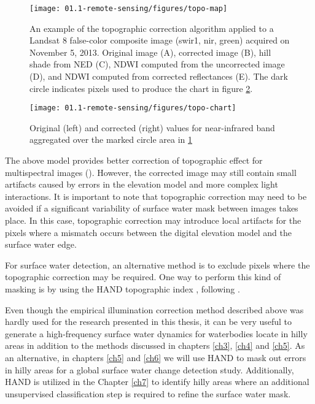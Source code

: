 \begin{figure}[H]
	\texttt{[image: 01.1-remote-sensing/figures/topo-map]}
	\caption{An example of the topographic correction algorithm \cite{tan2013improved} applied to a Landsat 8 false-color composite image (swir1, nir, green) acquired on November 5, 2013. Original image (A), corrected image (B), hill shade from \gls{NED} (C), \gls{NDWI} computed from the uncorrected image (D), and \gls{NDWI} computed from corrected reflectances (E). The dark circle indicates pixels used to produce the chart in figure \ref{fig:ch1-topo-chart}.  }
	\label{fig:ch1-topo-map}
\end{figure}

\begin{figure}[H]
	\texttt{[image: 01.1-remote-sensing/figures/topo-chart]}
	\caption{Original (left) and corrected (right) values for near-infrared band aggregated over the marked circle area in \protect \ref{fig:ch1-topo-map}}
	\label{fig:ch1-topo-chart}
\end{figure}


The above model provides better correction of topographic effect for multispectral images (\citet{tan2010illumination}). However, the corrected image may still contain small artifacts caused by errors in the elevation model and more complex light interactions. It is important to note that topographic correction may need to be avoided if a significant variability of surface water mask between images takes place. In this case, topographic correction may introduce local artifacts for the pixels where a mismatch occurs between the digital elevation model and the surface water edge.

For surface water detection, an alternative method is to exclude pixels where the topographic correction may be required. One way to perform this kind of masking is by using the \gls{HAND} topographic index \cite{Renno2008, Nobre2011}, following \citet{westerhoff2013automated}. 

Even though the empirical illumination correction method described above was hardly used for the research presented in this thesis, it can be very useful to generate a high-frequency surface water dynamics for waterbodies locate in hilly areas in addition to the methods discussed in chapters \ref{ch3}, \ref{ch4} and \ref{ch5}. As an alternative, in chapters \ref{ch5} and \ref{ch6} we will use \gls{HAND} to mask out errors in hilly areas for a global surface water change detection study. Additionally, \gls{HAND} is utilized in the Chapter \ref{ch7} to identify hilly areas where an additional unsupervised classification step is required to refine the surface water mask.

